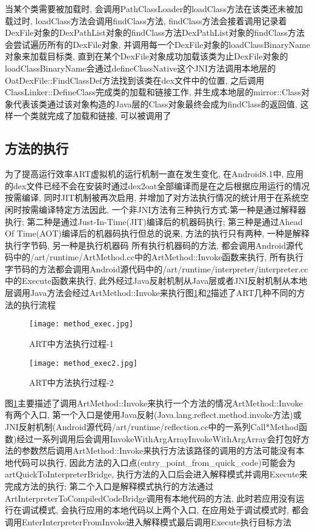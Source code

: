 当某个类需要被加载时, 会调用PathClassLoader的loadClass方法\juhao 在该类还未被加载过时, loadClass方法会调用findClass方法, findClass方法会接着调用记录着DexFile对象的DexPathList对象的findClass方法\juhao DexPathList对象的findClass方法会尝试遍历所有的DexFile对象, 并调用每一个DexFile对象的loadClassBinaryName对象来加载目标类, 直到在某个DexFile对象成功加载该类为止\juhao DexFile对象的loadClassBinaryName会通过defineClassNative这个JNI方法调用本地层的OatDexFile::FindClassDef方法找到该类在dex文件中的位置, 之后调用ClassLinker::DefineClass完成类的加载和链接工作, 并生成本地层的mirror::Class对象代表该类\juhao 通过该对象构造的Java层的Class对象最终会成为findClass的返回值, 这样一个类就完成了加载和链接, 可以被调用了\juhao 

\subsection{方法的执行}
\label{methodExecA}
为了提高运行效率ART虚拟机的运行机制一直在发生变化, 在Android8.1中, 应用的dex文件已经不会在安装时通过dex2oat全部编译而是在之后根据应用运行的情况按需编译, 同时JIT机制被再次启用, 并增加了对方法执行情况的统计用于在系统空闲时按需编译特定方法\juhao 因此, 一个非JNI方法有三种执行方式:第一种是通过解释器执行; 第二种是通过Just-In-Time(JIT)编译后的机器码执行; 第三种是通过Ahead Of Time(AOT)编译后的机器码执行\juhao 但总的说来, 方法的执行只有两种, 一种是解释执行字节码, 另一种是执行机器码\juhao 
所有执行机器码的方法, 都会调用Android源代码中的/art/runtime/ArtMethod.cc中的ArtMethod::Invoke函数来执行, 所有执行字节码的方法都会调用Android源代码中的/art/runtime/interpreter/interpreter.cc中的Execute函数来执行, 此外经过Java反射机制从Java层或者JNI反射机制从本地层调用Java方法会经过ArtMethod::Invoke来执行\juhao 图\ref{methodExec}和\ref{methodExec2}描述了ART几种不同的方法的执行流程\juhao 
\begin{figure}[ht]
	\centering
	\texttt{[image: method\_exec.jpg]}
	\caption{ART中方法执行过程-1}
	\label{methodExec}
\end{figure}

\begin{figure}[ht]
	\centering
	\texttt{[image: method\_exec2.jpg]}
	\caption{ART中方法执行过程-2}
	\label{methodExec2}
\end{figure}
图\ref{methodExec}主要描述了调用ArtMethod::Invoke来执行一个方法的情况\juhao ArtMethod::Invoke有两个入口, 第一个入口是使用Java反射(Java.lang.reflect.method.invoke方法)或JNI反射机制(Android源代码/art/runtime/reflection.cc中的一系列Call*Method函数)经过一系列调用后会调用InvokeWithArgArray\juhao InvokeWithArgArray会打包好方法的参数然后调用ArtMethod::Invoke来执行方法\juhao 该路径的调用的方法可能没有本地代码可以执行, 因此方法的入口点(entry\_point\_from\_quick\_code)可能会为artQuickToInterpreterBridge, 执行方法的入口后会进入解释模式并调用Execute来完成方法的执行; 第二个入口是解释模式执行的方法通过ArtInterpreterToCompiledCodeBridge调用有本地代码的方法, 此时若应用没有运行在调试模式, 会执行应用的本地代码\juhao 以上两个入口, 在应用处于调试模式时, 都会调用EnterInterpreterFromInvoke进入解释模式最后调用Execute执行目标方法\juhao 

